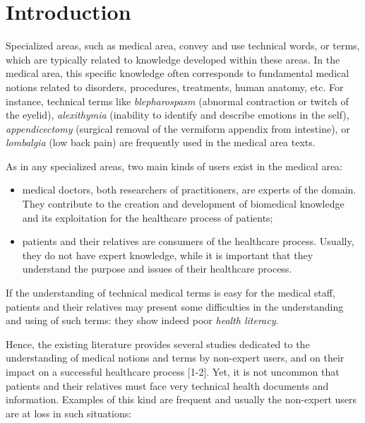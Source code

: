 \chapter{Introduction}
Specialized areas, such as medical area, convey and use technical words, or terms, which are typically related to knowledge developed within these areas. In the medical area, this specific knowledge often corresponds to fundamental medical notions related to disorders, procedures, treatments, human anatomy, etc. For instance, technical terms like \textit{blepharospasm} (abnormal contraction or twitch of the eyelid), \textit{alexithymia} (inability to identify and describe emotions in the self), \textit{appendicectomy} (surgical removal of the vermiform appendix from intestine), or \textit{lombalgia} (low back pain) are frequently used in the medical area texts.

As in any specialized areas, two main kinds of users exist in the medical area:

\begin{itemize}
    \item medical doctors, both researchers of practitioners, are experts of the domain. They contribute to the creation and development of biomedical knowledge and its exploitation for the healthcare process of patients;
    
    \item  patients and their relatives are consumers of the healthcare process. Usually, they do not have expert knowledge, while it is important that they understand the purpose and issues of their healthcare process. 
\end{itemize}

If the understanding of technical medical terms is easy for the medical staff, patients and their relatives may present some difficulties in the understanding and using of such terms: they show indeed poor \textit{health literacy}. 

Hence, the existing literature provides several studies dedicated to the understanding of medical notions and terms by non-expert users, and on their impact on a successful healthcare process [1-2]. Yet, it is not uncommon that patients and their relatives must face very technical health documents and information. Examples of this kind are frequent and usually the non-expert users are at loss in such situations:

